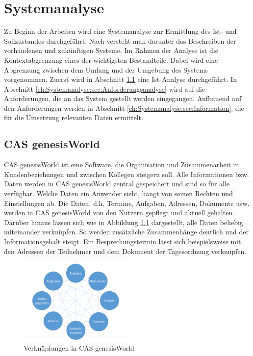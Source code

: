 
\chapter{Systemanalyse}
\label{ch:Systemanalyse}

Zu Beginn der Arbeiten wird eine Systemanalyse zur Ermittlung des Ist- und Sollzustandes durchgeführt. Nach \cite{SWB-380277719} versteht man darunter das Beschreiben der vorhandenen und zukünftigen Systeme. Im Rahmen der Analyse ist die Kontextabgrenzung eines der wichtigsten Bestandteile. Dabei wird eine Abgrenzung zwischen dem Umfang und der Umgebung des Systems vorgenommen. Zuerst wird in Abschnitt \ref{ch:Systemanalyse:sec:genesisWorld} eine Ist-Analyse durchgeführt. In Abschnitt \ref{ch:Systemanalyse:sec:Anforderungsanalyse} wird auf die Anforderungen, die an das System gestellt werden eingegangen. Aufbauend auf den Anforderungen werden in Abschnitt \ref{ch:Systemanalyse:sec:Information}, die für die Umsetzung relevanten Daten ermittelt. 

\section{CAS genesisWorld}
\label{ch:Systemanalyse:sec:genesisWorld}

CAS genesisWorld ist eine Software, die Organisation und Zusammenarbeit in Kundenbeziehungen und zwischen Kollegen steigern soll. Alle Informationen bzw. Daten werden in CAS genesisWorld zentral gespeichert und sind so für alle verfügbar. Welche Daten ein Anwender sieht, hängt von seinen Rechten und Einstellungen ab. Die Daten, d.h. Termine, Aufgaben, Adressen, Dokumente usw. werden in CAS genesisWorld von den Nutzern gepflegt und aktuell gehalten. Darüber hinaus lassen sich wie in Abbildung \ref{picGwCon} dargestellt, alle Daten beliebig miteinander verknüpfen. So werden zusätzliche Zusammenhänge deutlich und der Informationsgehalt steigt. Ein Besprechungstermin lässt sich beispielsweise mit den Adressen der Teilnehmer und dem Dokument der Tagesordnung verknüpfen.

\begin{figure}[H]
	\centering
  \includegraphics[width=0.5\textwidth, width=0.5\textwidth]{pics/CAS_connections.pdf}
	\caption{Verknüpfungen in CAS genesisWorld}
	\label{picGwCon}
\end{figure}

